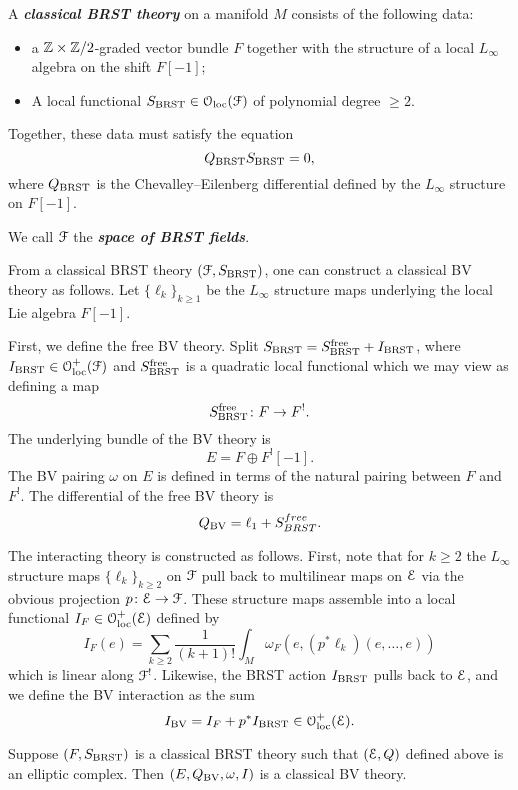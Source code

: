 \documentclass[10pt, oneside]{article}
\newcommand{\defterm}[1]{\textbf{\emph{#1}}}
\begin{document}
\begin{definition}
A \defterm{classical BRST theory} on a manifold $M$ consists of the following data:
\begin{itemize}
\item a $\mathbb Z\times\mathbb Z/2$-graded vector bundle $F$ together with the structure of a local $L_\infty$ algebra on the shift $F[-1]$;
\item A local functional $S_{\mathrm{BRST}} \in \mathcal{O}_{\rm loc}(\mathcal F)$ of polynomial degree $\geq 2$.
\end{itemize}
Together, these data must satisfy the equation
\[Q_{\mathrm{BRST}} S_{\mathrm{BRST}} = 0,\]
where $Q_{\mathrm{BRST}}$ is the Chevalley--Eilenberg differential defined by the $L_\infty$ structure on $F[-1]$. 
\end{definition}

We call $\mathcal F$ the \defterm{space of BRST fields}.

From a classical BRST theory $(\mathcal F, S_{\mathrm{BRST}})$, one can construct a classical BV theory as follows. Let $\{\ell_k\}_{k\geq 1}$ be the $L_\infty$ structure maps underlying the local Lie algebra $F[-1]$.

First, we define the free BV theory. Split $S_{\mathrm{BRST}} = S^{\mathrm{free}}_{\mathrm{BRST}} + I_{\mathrm{BRST}}$, where $I_{\mathrm{BRST}}\in\mathcal{O}_{\rm loc}^+(\mathcal F)$ and $S^{\mathrm{free}}_{\mathrm{BRST}}$ is a quadratic local functional which we may view as defining a map
\[S^{\mathrm{free}}_{\mathrm{BRST}}\colon F\rightarrow F^!.\]
The underlying bundle of the BV theory is
\[
E = F \oplus F^! [-1].
\]
The BV pairing $\omega$ on $E$ is defined in terms of the natural pairing between $F$ and $F^!$.
The differential of the free BV theory is
\[Q_{\mathrm{BV}} = \ell_1 + S^{free}_{BRST}.
\]


The interacting theory is constructed as follows. First, note that for $k \geq 2$ the $L_\infty$ structure maps $\{\ell_k\}_{k \geq 2}$ on $\mathcal F$ pull back to multilinear maps on $\mathcal E$ via the obvious projection $p\colon \mathcal E\rightarrow \mathcal F$. These structure maps assemble into a local functional $I_F \in \mathcal{O}_{\rm loc}^+(\mathcal E)$ defined by
\[
I_F (e) = \sum_{k \geq 2} \frac{1}{(k+1)!} \int_M \omega_F(e, (p^*\ell_k) (e, \ldots, e))
\] 
which is linear along $\mathcal F^!$. Likewise, the BRST action $I_{\mathrm{BRST}}$ pulls back to $\mathcal E$, and we define the BV interaction as the sum
\[
I_{\mathrm{BV}} = I_{F} + p^* I_{\mathrm{BRST}} \in \mathcal{O}_{\rm loc}^+(\mathcal E) .
\]

\begin{lemma}
Suppose $(F, S_{\mathrm{BRST}})$ is a classical BRST theory such that $(\mathcal E, Q)$ defined above is an elliptic complex. Then $(E, Q_{\mathrm{BV}}, \omega, I)$ is a classical BV theory.
\end{lemma}
\end{document}
